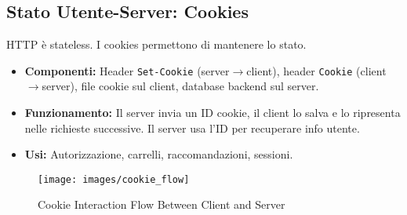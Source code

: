 \subsection{Stato Utente-Server: Cookies}
HTTP è stateless. I cookies permettono di mantenere lo stato.
\begin{itemize}
    \item \textbf{Componenti:} Header \texttt{Set-Cookie} (server$\rightarrow$client), header \texttt{Cookie} (client$\rightarrow$server), file cookie sul client, database backend sul server.
    \item \textbf{Funzionamento:} Il server invia un ID cookie, il client lo salva e lo ripresenta nelle richieste successive. Il server usa l'ID per recuperare info utente.
    \item \textbf{Usi:} Autorizzazione, carrelli, raccomandazioni, sessioni.
\end{itemize}
\begin{figure}[H]
\centering
\texttt{[image: images/cookie\_flow]}
\caption{Cookie Interaction Flow Between Client and Server}
\end{figure}


